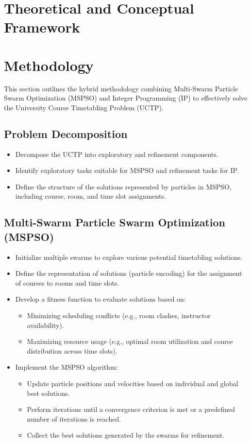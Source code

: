 \documentclass{article}
\begin{document}
\section{Theoretical and Conceptual Framework}
\label{sec:theoreticalframework}

\section{Methodology}
\label{sec
}

This section outlines the hybrid methodology combining Multi-Swarm Particle Swarm Optimization (MSPSO) and Integer Programming (IP) to effectively solve the University Course Timetabling Problem (UCTP).

\subsection{Problem Decomposition}
\label{subsec
} \begin{itemize} \item Decompose the UCTP into exploratory and refinement components. \item Identify exploratory tasks suitable for MSPSO and refinement tasks for IP. \item Define the structure of the solutions represented by particles in MSPSO, including course, room, and time slot assignments. \end{itemize}

\subsection{Multi-Swarm Particle Swarm Optimization (MSPSO)}
\label{subsec
} \begin{itemize} \item Initialize multiple swarms to explore various potential timetabling solutions. \item Define the representation of solutions (particle encoding) for the assignment of courses to rooms and time slots. \item Develop a fitness function to evaluate solutions based on: \begin{itemize} \item Minimizing scheduling conflicts (e.g., room clashes, instructor availability). \item Maximizing resource usage (e.g., optimal room utilization and course distribution across time slots). \end{itemize} \item Implement the MSPSO algorithm: \begin{itemize} \item Update particle positions and velocities based on individual and global best solutions. \item Perform iterations until a convergence criterion is met or a predefined number of iterations is reached. \item Collect the best solutions generated by the swarms for refinement. \end{itemize} \end{itemize}
\end{document}
